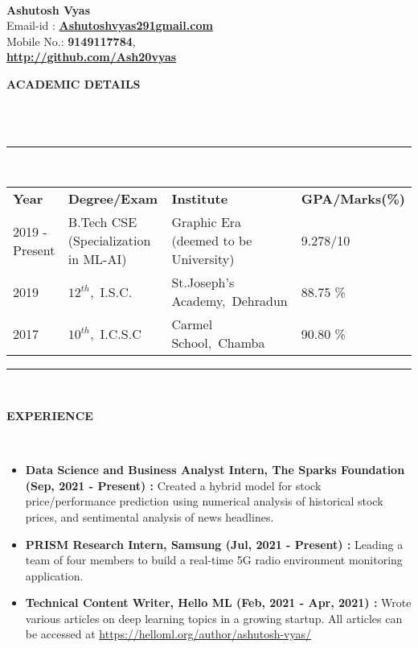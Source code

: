 \documentclass[a4paper,10pt]{article}
\newcommand{\lsep}{-0.5cm}
\newcommand{\resheading}[1]{{\small \colorbox{mygrey}{\begin{minipage}{0.975\textwidth}{\textbf{#1 \vphantom{p\^{E}}}}\end{minipage}}}}
\begin{document}
\hspace{0.5cm}\\[-0.2cm]

\textbf{Ashutosh Vyas} \\
\indent Email-id : \textbf{\url{Ashutoshvyas291gmail.com}} \\
\indent Mobile No.: \textbf{9149117784}, \ \\
\indent \textbf{\url{http://github.com/Ash20vyas}}\\

\resheading{\textbf{ACADEMIC DETAILS} }\\[\lsep]
\\
\indent \rule{6.8in}{0.4pt}\\
\indent \begin{tabular}{ l @{\hskip 0.15in} l @{\hskip 0.15in} l @{\hskip 0.15in} l @{\hskip 0.15in} }
\noindent \textbf{Year} & \textbf{Degree/Exam} & \textbf{Institute} & \textbf{GPA/Marks(\%)}\\
2019 - Present & B.Tech CSE (Specialization in ML-AI) & Graphic Era (deemed to be University) & 9.278/10 \\
2019 & $12^{th}$,\ I.S.C. & St.Joseph's Academy,\ Dehradun & 88.75 \% \\
2017 & $10^{th}$,\ I.C.S.C & Carmel School,\ Chamba & 90.80 \%\\

\end{tabular}
\indent \rule{6.8in}{0.4pt}
\\

\resheading{\textbf{EXPERIENCE} }\\[\lsep]
\begin{itemize}
\setlength\itemsep{0.5em}
\item \textbf{Data Science and Business Analyst Intern, The Sparks Foundation (Sep, 2021 - Present) : } Created a hybrid model for stock price/performance prediction using numerical analysis of historical stock prices, and sentimental analysis of news headlines.
\item \textbf{PRISM Research Intern, Samsung (Jul, 2021 - Present) : } Leading a team of four members to build a real-time 5G radio environment monitoring application.
\item \textbf{Technical Content Writer, Hello ML (Feb, 2021 - Apr, 2021) : }Wrote various articles on deep learning topics in a growing startup.
All articles can be accessed at \url{https://helloml.org/author/ashutosh-vyas/}
\end{itemize}
\end{document}
